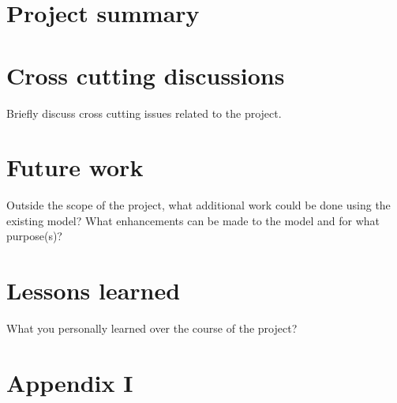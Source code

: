 \documentclass[11pt,a4paper]{article}
\begin{document}
\newpage

\section{Project summary}

\newpage 

\section{Cross cutting discussions} \label{cross-cutting}
Briefly discuss cross cutting issues related to the project.

\newpage

\section{Future work} \label{future-work}
Outside the scope of the project, what additional work could be done using the existing model? What enhancements can be made to the model and for what purpose(s)?

\newpage

\section{Lessons learned} \label{lessons-learned}

What you personally learned over the course of the project?


\setlength{\bibhang}{0pt}


\newpage

\section*{Appendix I} \label{appendix-i}


\end{document}
